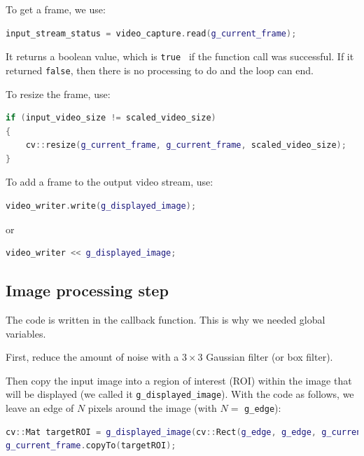 \documentclass[english,a4paper,12pt,oneside]{article}
\begin{document}
To get a frame, we use:
\begin{lstlisting}[language=c++]
input_stream_status = video_capture.read(g_current_frame);
\end{lstlisting}

It returns a boolean value, which is \verb+true + if the function call was successful. 
If it returned \verb+false+, then there is no processing to do and the loop can end. 


To resize the frame, use:
\begin{lstlisting}[language=c++]
if (input_video_size != scaled_video_size)
{
    cv::resize(g_current_frame, g_current_frame, scaled_video_size);
}
\end{lstlisting}

To add a frame to the output video stream, use:
\begin{lstlisting}[language=c++]
video_writer.write(g_displayed_image);
\end{lstlisting}
or
\begin{lstlisting}[language=c++]
video_writer << g_displayed_image;
\end{lstlisting}


%        
%




\subsection{Image processing step}

The code is written in the callback function. 
This is why we needed global variables. 

First, reduce the amount of noise with a $3 \times 3$ Gaussian filter (or box filter).

Then copy the input image into a region of interest (ROI) within the image that will be displayed (we called it \verb+g_displayed_image+). 
With the code as follows, we leave an edge of $N$ pixels around the image (with $N=$ \verb+g_edge+):
\begin{lstlisting}[language=c++]
cv::Mat targetROI = g_displayed_image(cv::Rect(g_edge, g_edge, g_current_frame.cols, g_current_frame.rows));
g_current_frame.copyTo(targetROI);
\end{lstlisting}
\end{document}
